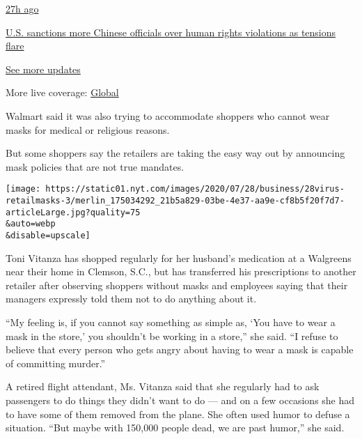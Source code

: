 \href{https://www.nytimes.com/live/2020/07/31/business/stock-market-today-coronavirus?action=click\&pgtype=Article\&state=default\&region=MAIN_CONTENT_1\&context=storylines_live_updates\#us-sanctions-more-chinese-officials-over-human-rights-violations-as-tensions-flare}{27h
ago}

\href{https://www.nytimes.com/live/2020/07/31/business/stock-market-today-coronavirus?action=click\&pgtype=Article\&state=default\&region=MAIN_CONTENT_1\&context=storylines_live_updates\#us-sanctions-more-chinese-officials-over-human-rights-violations-as-tensions-flare}{U.S.
sanctions more Chinese officials over human rights violations as
tensions flare}

\href{https://www.nytimes.com/live/2020/07/31/business/stock-market-today-coronavirus?action=click\&pgtype=Article\&state=default\&region=MAIN_CONTENT_1\&context=storylines_live_updates}{See
more updates}

More live coverage:
\href{https://www.nytimes.com/2020/08/01/world/coronavirus-covid-19.html?action=click\&pgtype=Article\&state=default\&region=MAIN_CONTENT_1\&context=storylines_live_updates}{Global}

Walmart said it was also trying to accommodate shoppers who cannot wear
masks for medical or religious reasons.

But some shoppers say the retailers are taking the easy way out by
announcing mask policies that are not true mandates.

\texttt{[image: https://static01.nyt.com/images/2020/07/28/business/28virus-retailmasks-3/merlin\_175034292\_21b5a829-03be-4e37-aa9e-cf8b5f20f7d7-articleLarge.jpg?quality=75\\\&auto=webp\\\&disable=upscale]}

Toni Vitanza has shopped regularly for her husband's medication at a
Walgreens near their home in Clemson, S.C., but has transferred his
prescriptions to another retailer after observing shoppers without masks
and employees saying that their managers expressly told them not to do
anything about it.

``My feeling is, if you cannot say something as simple as, `You have to
wear a mask in the store,' you shouldn't be working in a store,'' she
said. ``I refuse to believe that every person who gets angry about
having to wear a mask is capable of committing murder.''

A retired flight attendant, Ms. Vitanza said that she regularly had to
ask passengers to do things they didn't want to do --- and on a few
occasions she had to have some of them removed from the plane. She often
used humor to defuse a situation. ``But maybe with 150,000 people dead,
we are past humor,'' she said.


